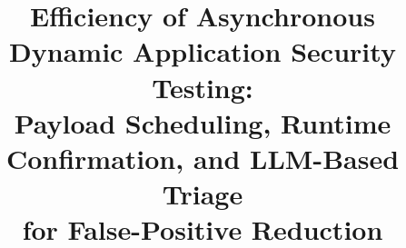 
\title{Efficiency of Asynchronous Dynamic Application Security Testing:\\
Payload Scheduling, Runtime Confirmation, and LLM-Based Triage\\
for False-Positive Reduction}

\author{%
}

\maketitle

